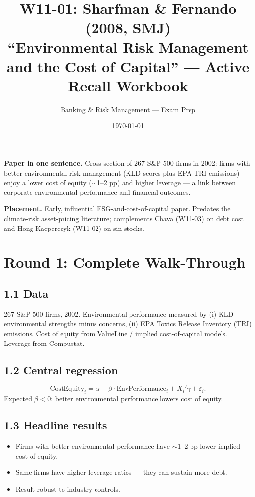 \documentclass[11pt]{article}
\title{W11-01: Sharfman \& Fernando (2008, SMJ) \\
\large ``Environmental Risk Management and the Cost of Capital'' --- Active Recall Workbook}
\author{Banking \& Risk Management --- Exam Prep}
\date{\today}
\begin{document}
\maketitle

\begin{keybox}
\textbf{Paper in one sentence.} Cross-section of 267 S\&P 500 firms in 2002: firms with better environmental risk management (KLD scores plus EPA TRI emissions) enjoy a lower cost of equity ($\sim$1--2 pp) and higher leverage --- a link between corporate environmental performance and financial outcomes.

\textbf{Placement.} Early, influential ESG-and-cost-of-capital paper. Predates the climate-risk asset-pricing literature; complements Chava (W11-03) on debt cost and Hong-Kacperczyk (W11-02) on sin stocks.
\end{keybox}

\section*{Round 1: Complete Walk-Through}

\subsection*{1.1 Data}
267 S\&P 500 firms, 2002. Environmental performance measured by (i) KLD environmental strengths minus concerns, (ii) EPA Toxics Release Inventory (TRI) emissions. Cost of equity from ValueLine / implied cost-of-capital models. Leverage from Compustat.

\subsection*{1.2 Central regression}
\[
\text{CostEquity}_i = \alpha + \beta\cdot\text{EnvPerformance}_i + X_i'\gamma + \varepsilon_i.
\]
Expected $\beta<0$: better environmental performance lowers cost of equity.

\subsection*{1.3 Headline results}
\begin{itemize}
\item Firms with better environmental performance have $\sim$1--2 pp lower implied cost of equity.
\item Same firms have higher leverage ratios --- they can sustain more debt.
\item Result robust to industry controls.
\end{itemize}
\end{document}
